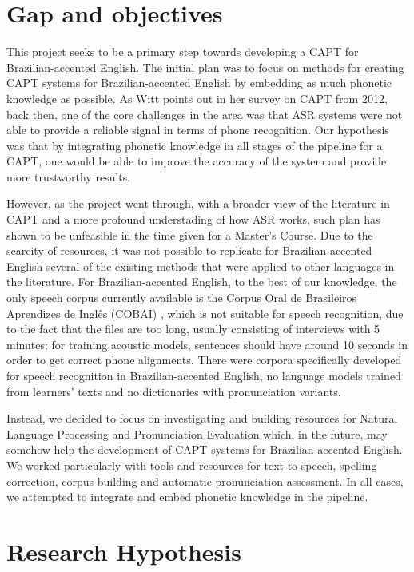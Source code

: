 \section*{Gap and objectives} 

This project seeks to be a primary step towards developing a \ac{CAPT} for Brazilian-accented English. The initial plan was to focus on methods for creating \ac{CAPT} systems for Brazilian-accented English by embedding as much phonetic knowledge as possible. As Witt \citep{Witt2012} points out in her survey on \ac{CAPT} from 2012, back then, one of the core challenges in the area was that \ac{ASR} systems were not able to provide a reliable signal in terms of phone recognition. Our hypothesis was that by integrating phonetic knowledge in all stages of the pipeline for a \ac{CAPT}, one would be able to improve the accuracy of the system and provide more trustworthy results.

However, as the project went through, with a broader view of the literature in \ac{CAPT} and a more profound understading of how \ac{ASR} works, such plan has shown to be unfeasible in the time given for a Master's Course. Due to the scarcity of resources, it was not possible to replicate for Brazilian-accented English several of the existing methods that were applied to other languages in the literature. For Brazilian-accented English, to the best of our knowledge, the only speech corpus currently available is the Corpus Oral de Brasileiros Aprendizes de Ingl\^es (COBAI) \cite{Mello2012}, which is not suitable for speech recognition, due to the fact that the files are too long, usually consisting of interviews with 5 minutes; for training acoustic models, sentences should have around 10 seconds in order to get correct phone alignments. There were corpora specifically developed for speech recognition in Brazilian-accented English, no language models trained from learners' texts and no dictionaries with pronunciation variants. 

Instead, we decided to focus on investigating and building resources for Natural Language Processing and Pronunciation Evaluation which, in the future, may somehow help the development of \ac{CAPT} systems for Brazilian-accented English. We worked particularly with tools and resources for text-to-speech, spelling correction, corpus building and automatic pronunciation assessment. In all cases, we attempted to integrate and embed phonetic knowledge in the pipeline.

\section*{Research Hypothesis}

